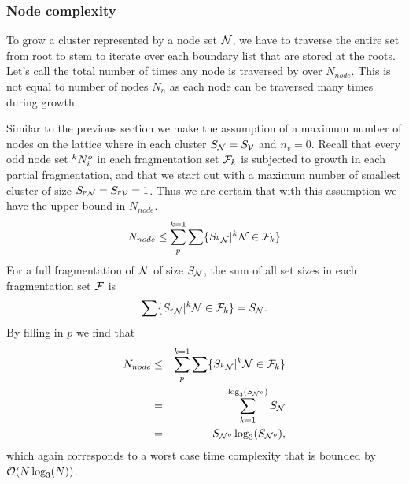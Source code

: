 \subsubsection{Node complexity} 

To grow a cluster represented by a node set $\mathcal{N}$, we have to traverse the entire set from root to stem to iterate over each boundary list that are stored at the roots. Let's call the total number of times any node is traversed by  over $N_{node}$. This is not equal to number of nodes $N_n$ as each node can be traversed many times during growth.

Similar to the previous section we make the assumption of a maximum number of nodes on the lattice where in each cluster $S_{\mathcal{N}} = S_{\mathcal{V}}$ and $n_v = 0$. Recall that every odd node set ${}^{k}N^o_i$ in each fragmentation set $\mathcal{F}_k$ is subjected to growth in each partial fragmentation, and that we start out with a maximum number of smallest cluster of size $S_{{}^{p}\mathcal{N}} = S_{{}^{p}\mathcal{V}} = 1$. Thus we are certain that with this assumption we have the upper bound in $N_{node}$. 
\begin{equation}\label{eq:nnode}
  N_{node} \leq \sum_{p}^{k=1}\sum \{ S_{{}^{k}\mathcal{N}} | {}^{k}\mathcal{N} \in \mathcal{F}_k \}
\end{equation}
For a full fragmentation of $\mathcal{N}$ of size $S_{\mathcal{N}}$, the sum of all set sizes in each fragmentation set $\mathcal{F}$ is
\begin{equation}\label{eq:sumsetsfrag}
  \sum \{S_{{}^{k}\mathcal{N}} | {}^{k}\mathcal{N} \in \mathcal{F}_k \} = S_{\mathcal{N}}. 
\end{equation}
By filling in $p$ we find that
\begin{eqnarray}
  \nonumber N_{node} &\leq& \sum_{p}^{k=1}\sum \{ S_{{}^{k}\mathcal{N}} | {}^{k}\mathcal{N} \in \mathcal{F}_k \} \\
  \nonumber &=& \sum_{k=1}^{\log_3(S_{\mathcal{N}^o})} S_{\mathcal{N}} \\
   &=& S_{\mathcal{N}^o}\log_3(S_{\mathcal{N}^o}), 
\end{eqnarray}
which again corresponds to a worst case time complexity that is bounded by $\mathcal{O}(N\log_3(N))$. 